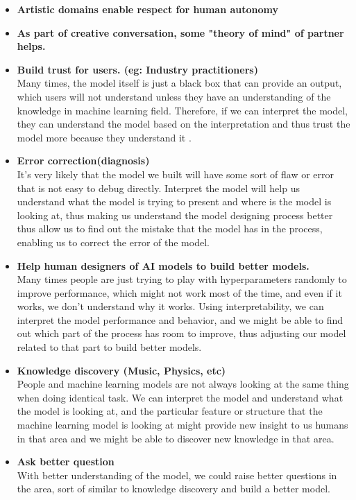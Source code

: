 \documentclass[]{article}
\begin{document}
\begin{itemize}
\item \textbf{Artistic domains enable respect for human autonomy} 
\item \textbf{As part of creative conversation, some "theory of mind" of partner helps.}
\item \textbf{Build trust for users. (eg: Industry practitioners)}\\
Many times, the model itself is just a black box that can provide an output, which users will not understand unless they have an understanding of the knowledge in machine learning field. Therefore, if we can interpret the model, they can understand the model based on the interpretation and thus trust the model more because they understand it \cite{b8, b9}.
\item \textbf{Error correction(diagnosis)}\\
It's very likely that the model we built will have some sort of flaw or error that is not easy to debug directly. Interpret the model will help us understand what the model is trying to present and where is the model is looking at, thus making us understand the model designing process better thus allow us to find out the mistake that the model has in the process, enabling us to correct the error of the model\cite{b8,b9}.
\item \textbf{Help human designers of AI models to build better models.}\\
Many times people are just trying to play with hyperparameters randomly to improve performance, which might not work most of the time, and even if it works, we don't understand why it works. Using interpretability, we can interpret the model performance and behavior, and we might be able to find out which part of the process has room to improve, thus adjusting our model related to that part to build better models.
\item \textbf{Knowledge discovery (Music, Physics, etc)}\\
People and machine learning models are not always looking at the same thing when doing identical task. We can interpret the model and understand what the model is looking at, and the particular feature or structure that the machine learning model is looking at might provide new insight to us humans in that area and we might be able to discover new knowledge in that area. 
\item \textbf{Ask better question}\\
With better understanding of the model, we could raise better questions in the area, sort of similar to knowledge discovery and build a better model.

\end{itemize}
\end{document}
